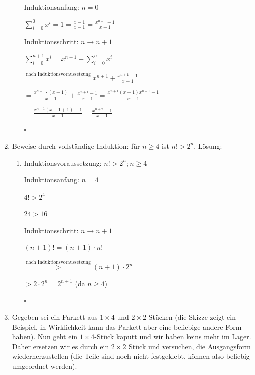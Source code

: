\documentclass[../main.tex]{subfiles}
\begin{document}
\begin{enumerate}
\begin{enumerate}
		            Induktionsanfang: \( n = 0 \)

		            \( \sum_{i = 0}^{0} x^i = 1 = \frac{x-1}{x-1} = \frac{x^{0 + 1} - 1}{ x - 1 } \)
		            \vspace{10pt}

		            Induktionsschritt: \( n \rightarrow n + 1 \)

		            \( \sum_{i = 0}^{n + 1} x^i = x^{n + 1} + \sum_{i = 0}^{n} x^i \)

		            \( \stackrel{\text{nach Induktionsvoraussetzung}}{=}
		            x^{n+1} +  \frac{x^{n + 1} - 1}{ x - 1 } \)

		            \( =  \frac{x^{n+1} \cdot (x - 1)}{x - 1} +  \frac{x^{n + 1} - 1}{ x - 1 }
		            = \frac{x^{n+1}(x - 1) x^{n + 1} - 1}{ x - 1 }\)

		            \( = \frac{x^{n + 1}(x - 1 + 1) - 1 }{ x - 1 }
		            =  \frac{x^{n + 2} - 1 }{ x - 1 } \)

		            \( \square \)
	      \end{enumerate}
	\item Beweise durch vollständige Induktion: für \(  n \geq 4 \) ist \( n! > 2^n \).
	      Lösung:
	      \begin{enumerate}
		      \item Induktionsvoraussetzung:
		            \( n! > 2^n ; n \geq 4 \)
		            \vspace{10pt}

		            Induktionsanfang: \( n = 4 \)

		            \( 4! > 2^4 \)

		            \( 24 > 16 \)
		            \vspace{10pt}

		            Induktionsschritt: \( n \rightarrow n + 1 \)

		            \( (n + 1)! = (n + 1) \cdot n! \)

		            \( \stackrel{\text{nach Induktionsvoraussetzung}}{>}
		            (n + 1) \cdot 2^n \)

		            \( > 2 \cdot 2^n = 2^{n + 1} \) (da \( n \geq 4 \))

		            \( \square \)
	      \end{enumerate}
	\item Gegeben sei ein Parkett aus \( 1 \times 4 \) und \( 2 \times 2 \)-Stücken (die Skizze zeigt ein Beispiel,
	      in Wirklichkeit kann das Parkett aber eine beliebige andere Form haben).
	      Nun geht ein \( 1 \times 4 \)-Stück kaputt und wir haben keins mehr im Lager.
	      Daher ersetzen wir es durch ein \( 2 \times 2 \) Stück und versuchen, die Ausgangsform wiederherzustellen
		(die Teile sind noch nicht festgeklebt, können also beliebig umgeordnet werden).


\end{enumerate}
\end{document}
